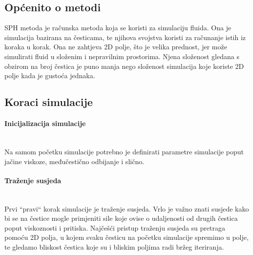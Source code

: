 \documentclass[diplomskirad]{fer}
\newcommand{\paragraphnewline}[1]{\paragraph{#1}\mbox{}\\}
\begin{document}
    \subsection{Općenito o metodi}\label{subsec:opcenito-o-metodi}

    SPH\cite{SPHmethod} metoda je računska metoda koja se koristi za simulaciju fluida.
    Ona je simulacija bazirana na česticama, te njihova svojstva koristi za računanje istih iz koraka u korak.
    Ona ne zahtjeva 2D polje, što je velika prednost, jer može simulirati fluid u složenim i nepravilnim prostorima.
    Njena složenost gledana s obzirom na broj čestica je puno manja nego složenost simulacija koje koriste 2D polje kada je gustoća jednaka.

    \newpage
    \subsection{Koraci simulacije}\label{subsec:koraci-simulacije}

    \paragraphnewline{Inicijalizacija simulacije}
    Na samom početku simulacije potrebno je definirati parametre simulacije poput jačine viskoze, međučestično odbijanje i slično.

    \paragraphnewline{Traženje susjeda}

    Prvi ``pravi`` korak simulacije je traženje susjeda.
    Vrlo je važno znati susjede kako bi se na čestice mogle primjeniti sile koje ovise o udaljenosti od drugih čestica poput viskoznosti i pritiska.
    Najčešći pristup traženju susjeda su pretraga pomoću 2D polja, u kojem svaku česticu na početku simulacije spremimo u polje, te gledamo bliskost čestica koje su i bliskim poljima radi bržeg iteriranja.
\end{document}
